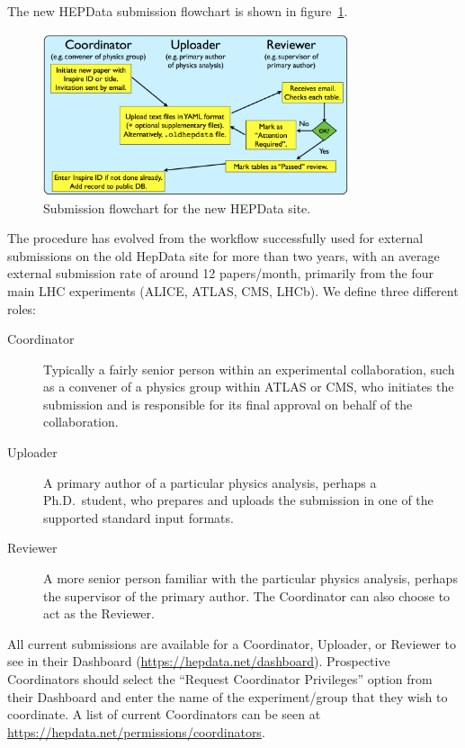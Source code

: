 \documentclass[a4paper]{jpconf}
\begin{document}
The new HEPData submission flowchart is shown in figure~\ref{fig:submission}.
%
\begin{figure}
  \begin{center}
    \includegraphics[width=0.8\textwidth]{Figures/submission_flowchart.pdf}
  \end{center}
  \caption{\label{fig:submission}Submission flowchart for the new HEPData site.}
\end{figure}
%
The procedure has evolved from the workflow successfully used for external submissions on the old HepData site for more than two years, with an average external submission rate of around 12 papers/month, primarily from the four main LHC experiments (ALICE, ATLAS, CMS, LHCb).  We define three different roles:
%
\begin{description}
\item [Coordinator] Typically a fairly senior person within an experimental collaboration, such as a convener of a physics group within ATLAS or CMS, who initiates the submission and is responsible for its final approval on behalf of the collaboration.
\item [Uploader] A primary author of a particular physics analysis, perhaps a Ph.D.~student, who prepares and uploads the submission in one of the supported standard input formats.
\item [Reviewer] A more senior person familiar with the particular physics analysis, perhaps the supervisor of the primary author.  The Coordinator can also choose to act as the Reviewer.
\end{description}
%
All current submissions are available for a Coordinator, Uploader, or Reviewer to see in their Dashboard (\url{https://hepdata.net/dashboard}).  Prospective Coordinators should select the ``Request Coordinator Privileges'' option from their Dashboard and enter the name of the experiment/group that they wish to coordinate.  A list of current Coordinators can be seen at \url{https://hepdata.net/permissions/coordinators}.
\end{document}
